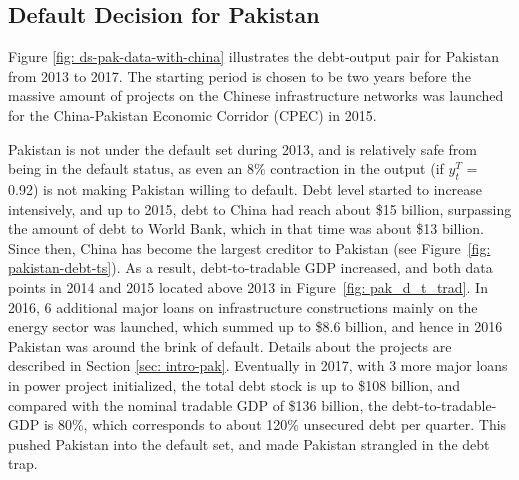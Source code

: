 \subsection{Default Decision for Pakistan}

Figure \ref{fig: ds-pak-data-with-china} illustrates the debt-output pair for Pakistan from 2013 to 2017. The starting period is chosen to be two years before the massive amount of projects on the Chinese infrastructure networks was launched for the China-Pakistan Economic Corridor (CPEC) in 2015.

Pakistan is not under the default set during 2013, and is relatively safe from being in the default status, as even an 8\% contraction in the output (if $y^T_t$ = 0.92) is not making Pakistan willing to default. Debt level started to increase intensively, and up to 2015, debt to China had reach about \$15 billion, surpassing the amount of debt to World Bank, which in that time was about \$13 billion. Since then, China has become the largest creditor to Pakistan (see Figure~\ref{fig: pakistan-debt-ts}). As a result, debt-to-tradable GDP increased, and both data points in 2014 and 2015 located above 2013 in Figure~\ref{fig: pak_d_t_trad}. In 2016, 6 additional major loans on infrastructure constructions mainly on the energy sector was launched, which summed up to \$8.6 billion, and hence in 2016 Pakistan was around the brink of default. Details about the projects are described in Section \ref{sec: intro-pak}.
Eventually in 2017, with 3 more major loans in power project initialized, the total debt stock is up to \$108 billion, and compared with the nominal tradable GDP of \$136 billion, the debt-to-tradable-GDP is 80\%, which corresponds to about 120\% unsecured debt per quarter. This pushed Pakistan into the default set, and made Pakistan strangled in the debt trap.

